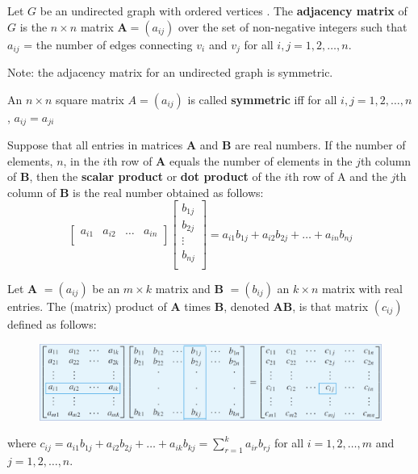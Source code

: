 \documentclass{article}
\begin{document}
\begin{description}
    \item[Adjacency Matrix of an Undirected Graph] Let $G$ be an undirected graph with ordered vertices . The \textbf{adjacency matrix} of $G$ is the $n\times n$ matrix $\mathbf{A}=(a_{ij})$ over the set of non-negative integers such that $a_{ij}$ = the number of edges connecting $v_{i}$ and $v_{j}$ for all $i, j = 1, 2, \dots, n$.
    \item \qquad Note: the adjacency matrix for an undirected graph is symmetric.
    \item[Symmetric Matrix] An $n\times n$ square matrix $A=(a_{ij})$ is called \textbf{symmetric} iff for all $i,j=1,2,\dots, n$, $a_{ij}=a_{ji}$
    \item[Scalar Product] Suppose that all entries in matrices \textbf{A} and \textbf{B} are real numbers. If the number of elements, $n$, in the $i$th row of \textbf{A} equals the number of elements in the $j$th column of \textbf{B}, then the \textbf{scalar product} or \textbf{dot product} of the $i$th row of A and the $j$th column of \textbf{B} is the real number obtained as follows: 
    \[ 
	\begin{bmatrix}
	   	a_{i1} & a_{i2} & \dots & a_{in} \\
	\end{bmatrix}
	\begin{bmatrix}
    	b_{1j} \\
    	b_{2j} \\
		\vdots \\
		b_{nj} \\
    \end{bmatrix}
    = a_{i1}b_{1j} + a_{i2}b_{2j} + \dots + a_{in}b_{nj}
    \]
    \item[Matrix Multiplication] Let \textbf{A} $= (a_{ij})$ be an $m\times k$ matrix and \textbf{B} $= (b_{ij})$ an $k\times n$ matrix with real entries. The (matrix) product of \textbf{A} times \textbf{B}, denoted \textbf{AB}, is that matrix $(c_{ij})$ defined as
follows:
	\begin{figure}[H]
		\centering
		\includegraphics[scale=0.5]{matrix_multiplication}
	\end{figure}
	\item \qquad where $c_{ij}=a_{i1}b_{1j}+a_{i2}b_{2j}+\dots+a_{ik}b_{kj}=\sum^{k}_{r=1}a_{ir}b_{rj}$ for all $i=1,2,\dots,m$ and $j=1,2,\dots,n$.

\end{description}
\end{document}

